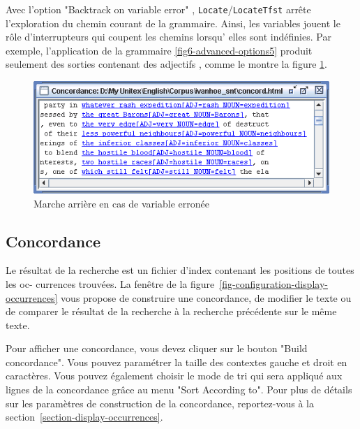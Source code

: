 \noindent Avec l'option "Backtrack on variable error" ,
\verb+Locate+/\verb+LocateTfst+ arrête l'exploration du chemin courant de la
grammaire. Ainsi, les variables jouent  le rôle d'interrupteurs qui coupent les chemins
lorsqu' elles sont indéfinies. Par exemple, l'application de la grammaire
\ref{fig6-advanced-options5} produit seulement des sorties contenant des adjectifs
, comme le montre la figure \ref{fig6-advanced-options8}. 

\bigskip
\begin{figure}[!h]
\begin{center}
\includegraphics[width=13cm]{resources/img/fig6-advanced-options8.png}
\caption{Marche arrière en cas de variable erronée\label{fig6-advanced-options8}}
\end{center}
\end{figure}



\subsection{Concordance}
Le résultat de la recherche est un fichier d’index contenant les positions de toutes les oc-
currences trouvées. La fenêtre de la figure~\ref{fig-configuration-display-occurrences}                                               vous propose de construire une concordance,
de modifier le texte ou de comparer le résultat de la recherche à la recherche précédente sur
le même texte.


\bigskip
{}
\noindent Pour afficher une concordance, vous devez cliquer sur le bouton "Build concordance".
Vous pouvez paramétrer la taille des contextes gauche et droit en caractères. Vous pouvez
également choisir le mode de tri qui sera appliqué aux lignes de la concordance grâce au
menu "Sort According to". Pour plus de détails sur les paramètres de construction de la
concordance, reportez-vous à la section~\ref{section-display-occurrences}.

